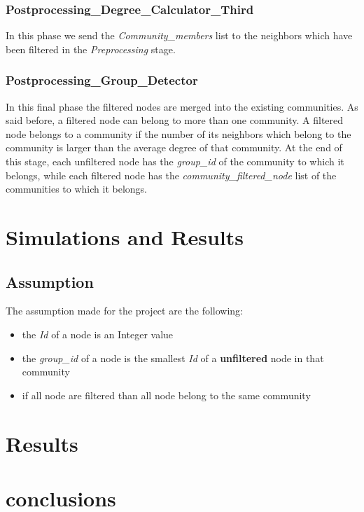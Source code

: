 \documentclass[12pt]{article}
\begin{document}
\subsubsection{Postprocessing\_Degree\_Calculator\_Third}
In this phase we send the \emph{Community\_members} list to the neighbors which have been filtered in the \emph{Preprocessing} stage.
\subsubsection{Postprocessing\_Group\_Detector}
In this final phase the filtered nodes are merged into the existing communities. As said before, a filtered node can belong to more than one community. A filtered node belongs to a community if the number of its neighbors which belong to the community is larger than the average degree of that community. At the end of this stage, each unfiltered node has the \emph{group\_id} of the community to which it belongs, while each filtered node has the \emph{community\_filtered\_node} list of the communities to which it belongs.
\section{Simulations and Results}
\subsection{Assumption}
The assumption made for the project are the following:
\begin{itemize}
    \item the \emph{Id} of a node is an Integer value
    \item the \emph{group\_id} of a node is the smallest \emph{Id} of a \textbf{unfiltered }node in that community
    \item if all node are filtered than all node belong to the same community
\end{itemize}


\section{Results}\label{results}
\section{conclusions}
\label{conclu}




\end{document}
